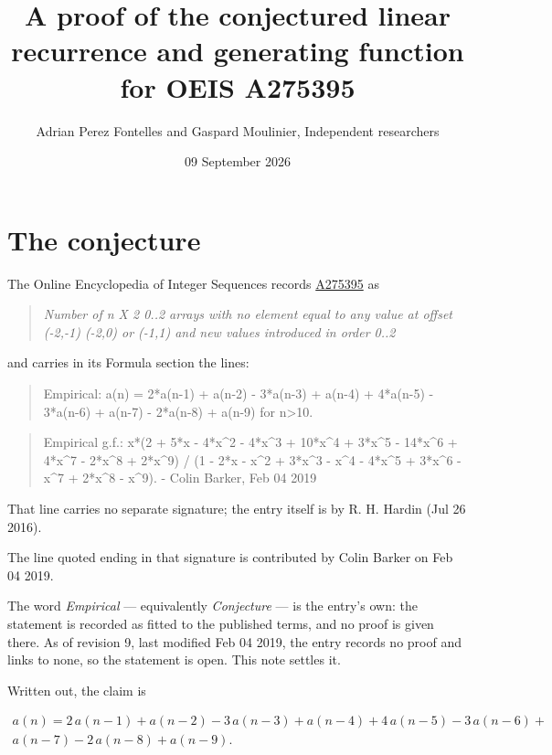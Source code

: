 \documentclass[11pt]{article}
\title{A proof of the conjectured linear recurrence and generating function for OEIS A275395}
\author{Adrian Perez Fontelles and Gaspard Moulinier, Independent researchers}
\date{09 September 2026}
\theoremstyle{definition}
\begin{document}
\maketitle
\section{The conjecture}

The Online Encyclopedia of Integer Sequences records \href{https://oeis.org/A275395}{A275395} as

\begin{quote}\itshape Number of n X 2 0..2 arrays with no element equal to any value at offset (-2,-1) (-2,0) or (-1,1) and new values introduced in order 0..2\end{quote}

and carries in its Formula section the lines:

\begin{quote}\ttfamily Empirical: a(n) = 2*a(n-1) + a(n-2) - 3*a(n-3) + a(n-4) + 4*a(n-5) - 3*a(n-6) + a(n-7) -  2*a(n-8) + a(n-9) for n>10.\end{quote}

\begin{quote}\ttfamily Empirical g.f.: x*(2 + 5*x - 4*x\textasciicircum{}2 - 4*x\textasciicircum{}3 + 10*x\textasciicircum{}4 + 3*x\textasciicircum{}5 - 14*x\textasciicircum{}6 + 4*x\textasciicircum{}7 - 2*x\textasciicircum{}8 + 2*x\textasciicircum{}9) / (1 - 2*x - x\textasciicircum{}2 + 3*x\textasciicircum{}3 - x\textasciicircum{}4 - 4*x\textasciicircum{}5 + 3*x\textasciicircum{}6 - x\textasciicircum{}7 + 2*x\textasciicircum{}8 - x\textasciicircum{}9). - Colin Barker, Feb 04 2019\end{quote}

That line carries no separate signature; the entry itself is by R. H. Hardin (Jul 26 2016).

The line quoted ending in that signature is contributed by Colin Barker on Feb 04 2019.

The word {\itshape Empirical} --- equivalently {\itshape Conjecture} --- is the entry's own: the statement is recorded as fitted to the published terms, and no proof is given there. As of revision 9, last modified Feb 04 2019, the entry records no proof and links to none, so the statement is open. This note settles it.

Written out, the claim is

\begin{multline*} a(n) = 2\,a(n-1) + a(n-2) - 3\,a(n-3) + a(n-4) + 4\,a(n-5) - 3\,a(n-6) + \\ a(n-7) - 2\,a(n-8) + a(n-9). \end{multline*}
\end{document}
